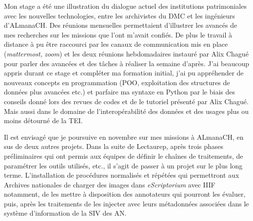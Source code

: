 Mon stage a été une illustration du dialogue actuel des institutions patrimoniales avec les nouvelles technologies, entre les archivistes du DMC et les ingénieurs d'ALmanaCH. Des réunions mensuelles permettaient d'illustrer les avancés de mes recherches sur les missions que l'ont m'avait confiés. De plus le travail à distance à pu être raccourci par les canaux de communication mis en place (\textit{mattermost}, \textit{zoom}) et les deux réunions hebdomadaires instauré par Alix Chagué pour parler des avancées et des tâches à réaliser la semaine d'après. J'ai beaucoup appris durant ce stage et compléter ma formation initial, j'ai pu appréhender de nouveaux concepts en programmation (POO, exploitation des structures de données plus avancées etc.) et parfaire ma syntaxe en Python par le biais des conseils donné lors des revues de codes et de le tutoriel présenté par Alix Chagué. Mais aussi dans le domaine de l'interopérabilité des données et des usages plus ou moins détourné de la TEI.  

Il est envisagé que je poursuive en novembre sur mes missions à ALmanaCH, en sus de deux autres projets. Dans la suite de Lectaurep, après trois phases préliminaires qui ont permis aux équipes de définir le chaînes de traitements, de paramétrer les outils utilisés, etc., il s'agit de passer à un projet sur le plus long terme. L'installation de procédures normalisés et répétées qui permettront aux Archives nationales de charger des images dans \textit{eScriptorium} avec IIIF notamment, de les mettre à disposition des annotateurs qui pourront les évaluer, puis, après les traitements de les injecter avec leurs métadonnées associées dans le système d'information de la SIV des AN. 